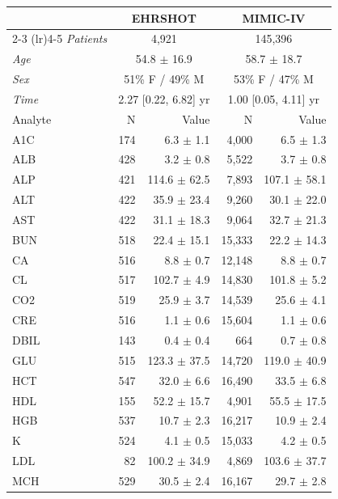 \begin{table}[ht]
\centering
\scriptsize
\begin{tabular}{lrrrr}
\toprule
  & \multicolumn{2}{c}{EHRSHOT} & \multicolumn{2}{c}{MIMIC-IV} \\
\cmidrule(lr){2-3} \cmidrule(lr){4-5}
\textit{Patients} & \multicolumn{2}{c}{4,921} & \multicolumn{2}{c}{145,396} \\
\textit{Age} & \multicolumn{2}{c}{54.8 $\pm$ 16.9} & \multicolumn{2}{c}{58.7 $\pm$ 18.7} \\
\textit{Sex} & \multicolumn{2}{c}{51\% F / 49\% M} & \multicolumn{2}{c}{53\% F / 47\% M} \\
\textit{Time} & \multicolumn{2}{c}{2.27 [0.22, 6.82] yr} & \multicolumn{2}{c}{1.00 [0.05, 4.11] yr} \\
\midrule
Analyte & N & Value & N & Value \\
\midrule
A1C & 174 & 6.3 $\pm$ 1.1 & 4,000 & 6.5 $\pm$ 1.3 \\
ALB & 428 & 3.2 $\pm$ 0.8 & 5,522 & 3.7 $\pm$ 0.8 \\
ALP & 421 & 114.6 $\pm$ 62.5 & 7,893 & 107.1 $\pm$ 58.1 \\
ALT & 422 & 35.9 $\pm$ 23.4 & 9,260 & 30.1 $\pm$ 22.0 \\
AST & 422 & 31.1 $\pm$ 18.3 & 9,064 & 32.7 $\pm$ 21.3 \\
BUN & 518 & 22.4 $\pm$ 15.1 & 15,333 & 22.2 $\pm$ 14.3 \\
CA & 516 & 8.8 $\pm$ 0.7 & 12,148 & 8.8 $\pm$ 0.7 \\
CL & 517 & 102.7 $\pm$ 4.9 & 14,830 & 101.8 $\pm$ 5.2 \\
CO2 & 519 & 25.9 $\pm$ 3.7 & 14,539 & 25.6 $\pm$ 4.1 \\
CRE & 516 & 1.1 $\pm$ 0.6 & 15,604 & 1.1 $\pm$ 0.6 \\
DBIL & 143 & 0.4 $\pm$ 0.4 & 664 & 0.7 $\pm$ 0.8 \\
GLU & 515 & 123.3 $\pm$ 37.5 & 14,720 & 119.0 $\pm$ 40.9 \\
HCT & 547 & 32.0 $\pm$ 6.6 & 16,490 & 33.5 $\pm$ 6.8 \\
HDL & 155 & 52.2 $\pm$ 15.7 & 4,901 & 55.5 $\pm$ 17.5 \\
HGB & 537 & 10.7 $\pm$ 2.3 & 16,217 & 10.9 $\pm$ 2.4 \\
K & 524 & 4.1 $\pm$ 0.5 & 15,033 & 4.2 $\pm$ 0.5 \\
LDL & 82 & 100.2 $\pm$ 34.9 & 4,869 & 103.6 $\pm$ 37.7 \\
MCH & 529 & 30.5 $\pm$ 2.4 & 16,167 & 29.7 $\pm$ 2.8 \\

\end{tabular}
\end{table}
